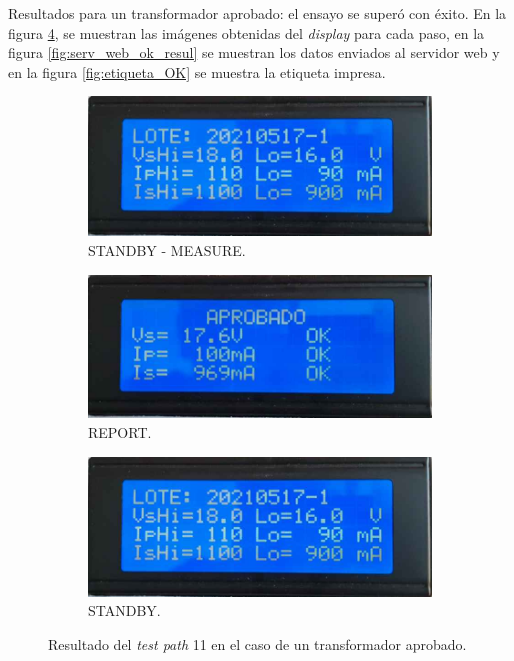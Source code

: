 \pagebreak

Resultados para un transformador aprobado: el ensayo se superó con éxito. En la figura \ref{fig:pruConf_11_res_b}, se muestran las imágenes obtenidas del \textit{display} para cada paso, en la figura \ref{fig:serv_web_ok_resul} se muestran los datos enviados al servidor web y en la figura \ref{fig:etiqueta_OK} se muestra la etiqueta impresa.

\begin{figure}[!htpb]
     \centering
     \begin{subfigure}[b]{0.4\textwidth}
         \centering
         \includegraphics[width=1.1\textwidth]{./Figures/pru_pass.jpeg}
         \caption{STANDBY - MEASURE.}
         \label{fig:pruConf_11_1_b}
     \end{subfigure}
          \hfill
     \begin{subfigure}[b]{0.4\textwidth}
         \centering
         \includegraphics[width=1.1\textwidth]{./Figures/aprobado.jpeg}
         \caption{REPORT.}
         \label{fig:pruConf_11_2_b}
     \end{subfigure}
           \hfill
     \begin{subfigure}[b]{0.4\textwidth}
         \centering
         \includegraphics[width=1.1\textwidth]{./Figures/pru_pass.jpeg}
         \caption{STANDBY.}
         \label{fig:pruConf_11_3_b}
     \end{subfigure}
        \caption{Resultado del \textit{test path} 11 en el caso de un transformador aprobado.}
        \label{fig:pruConf_11_res_b}
\end{figure}

